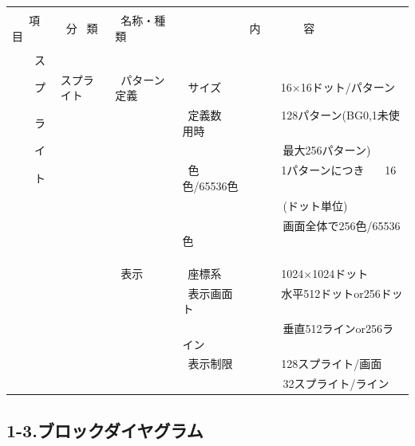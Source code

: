 ﻿\documentclass[twoside,a4paper,12pt]{article}
\begin{document}
\begin{tabular}{|p{17mm}|p{20mm}|p{27mm}|p{100mm}|}
\hline
& & &\\
\ \ \ 項目 & \ 分 \ 類 & \ 名称・種類 & \ \ \ \ \ \ \ \ \ \ \ \ 内 \ \ \ \ \ \ \ 容\\[1mm]
\hline
& & &\\[-3mm]
\ \ \ \ ス & & &\\[3mm]
\ \ \ \ プ & スプライト & \ パターン定義 & \ サイズ \ \ \ \ \ \ \ \ \ \ 16×16ドット/パターン\\[3mm]
\ \ \ \ ラ & & & \ 定義数 \ \ \ \ \ \ \ \ \ \ 128パターン(BG0,1未使用時\\[3mm]
\ \ \ \ イ & & & \ \ \ \ \ \ \ \ \ \ \ \ \ \ \ \ \ \ 最大256パターン)\\[3mm]
\ \ \ \ ト & & & \ 色 \ \ \ \ \ \ \ \ \ \ \ \ \ \ 1パターンにつき \ \ \ 16色/65536色\\[3mm]
& & & \ \ \ \ \ \ \ \ \ \ \ \ \ \ \ \ \ \ (ドット単位)\\[3mm]
& & & \ \ \ \ \ \ \ \ \ \ \ \ \ \ \ \ \ \ 画面全体で256色/65536色\\
& & &\\
& & &\\
\cline{3-4}
& & &\\[-2mm]
& & \ 表示 & \ 座標系 \ \ \ \ \ \ \ \ \ \ 1024×1024ドット\\[3mm]
& & & \ 表示画面 \ \ \ \ \ \ \ \ 水平512ドットor256ドット\\[3mm]
& & & \ \ \ \ \ \ \ \ \ \ \ \ \ \ \ \ \ \ 垂直512ラインor256ライン\\[3mm]
& & & \ 表示制限 \ \ \ \ \ \ \ \ 128スプライト/画面\\[3mm]
& & & \ \ \ \ \ \ \ \ \ \ \ \ \ \ \ \ \ \ 32スプライト/ライン\\
\hline
\end{tabular}

\newpage

\subsection*{1-3.ブロックダイヤグラム}
\end{document}
